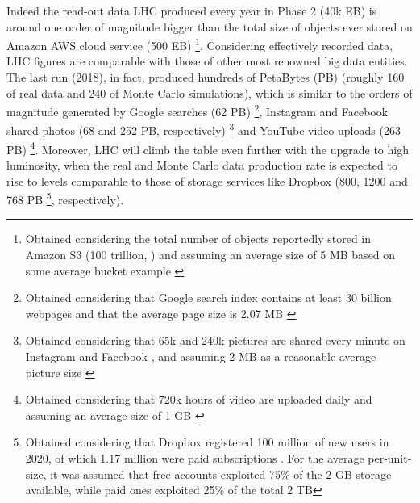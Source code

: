 Indeed the read-out data LHC produced every year in Phase 2 (40k EB) is around one order of magnitude bigger than the total size of objects ever stored on Amazon AWS cloud service (500 EB)%
\footnote{Obtained considering the total number of objects reportedly stored in Amazon S3 (100 trillion, ) and assuming an average size of 5 MB based on some average bucket example \cite{amazon2021objectssize}}.
Considering effectively recorded data, LHC figures are comparable with those of other most renowned big data entities. The last run (2018), in fact, produced hundreds of PetaBytes (PB) (roughly 160 of real data and 240 of Monte Carlo simulations),
 which is similar to the orders of magnitude generated by Google searches (62 PB)%
\footnote{Obtained considering that Google search index contains at least 30 billion webpages \cite{van2016estimating, google2021index_size, djuraskovic2020googl_stats, indig2020index_size} and that the average page size is 2.07 MB \cite{http2021webpage_size}
},
Instagram and Facebook shared photos (68 and 252 PB, respectively)%
\footnote{Obtained considering that 65k and 240k pictures are shared every minute on Instagram and Facebook \cite{domo2021infographic}, and assuming 2 MB as a reasonable average picture size \cite{adobe2021fb_img_size}
}
and YouTube video uploads (263 PB)%
\footnote{Obtained considering that 720k hours of video are uploaded daily \cite{domo2021infographic} and assuming an average size of 1 GB \cite{quora2021youtube}
}.
Moreover, LHC will climb the table even further with the upgrade to high luminosity, when the real and Monte Carlo data production rate is expected to rise to levels comparable to those of storage services like Dropbox (800, 1200 and 768 PB%
\footnote{Obtained considering that Dropbox registered 100 million of new users in 2020, of which 1.17 million were paid subscriptions \cite{dean2021dropbox}. For the average per-unit-size, it was assumed that free accounts exploited 75\% of the 2 GB storage available, while paid ones exploited 25\% of the total 2 TB
}, respectively). 

